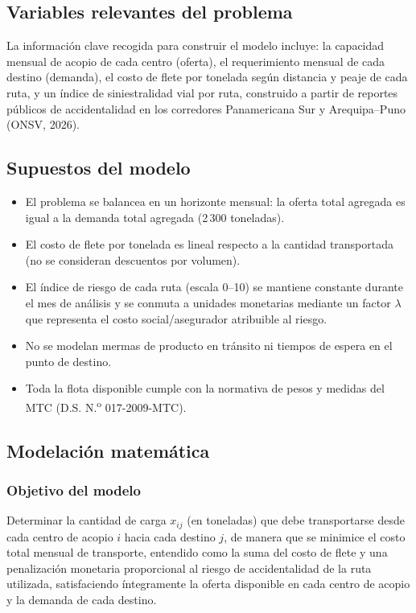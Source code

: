 \documentclass[11pt,a4paper]{article}
\begin{document}
\subsection{Variables relevantes del problema}
La informaci\'on clave recogida para construir el modelo incluye: la capacidad mensual de acopio de cada centro (oferta), el requerimiento mensual de cada destino (demanda), el costo de flete por tonelada seg\'un distancia y peaje de cada ruta, y un \'indice de siniestralidad vial por ruta, construido a partir de reportes p\'ublicos de accidentalidad en los corredores Panamericana Sur y Arequipa--Puno (ONSV, 2026).

\subsection{Supuestos del modelo}
\label{sec:supuestos}
\begin{itemize}
  \item El problema se balancea en un horizonte mensual: la oferta total agregada es igual a la demanda total agregada (2\,300 toneladas).
  \item El costo de flete por tonelada es lineal respecto a la cantidad transportada (no se consideran descuentos por volumen).
  \item El \'indice de riesgo de cada ruta (escala 0--10) se mantiene constante durante el mes de an\'alisis y se conmuta a unidades monetarias mediante un factor $\lambda$ que representa el costo social/asegurador atribuible al riesgo.
  \item No se modelan mermas de producto en tr\'ansito ni tiempos de espera en el punto de destino.
  \item Toda la flota disponible cumple con la normativa de pesos y medidas del MTC (D.S. N.\textsuperscript{o} 017-2009-MTC).
\end{itemize}

\subsection{Modelaci\'on matem\'atica}

\subsubsection{Objetivo del modelo}
Determinar la cantidad de carga $x_{ij}$ (en toneladas) que debe transportarse desde cada centro de acopio $i$ hacia cada destino $j$, de manera que se minimice el costo total mensual de transporte, entendido como la suma del costo de flete y una penalizaci\'on monetaria proporcional al riesgo de accidentalidad de la ruta utilizada, satisfaciendo \'integramente la oferta disponible en cada centro de acopio y la demanda de cada destino.
\end{document}
